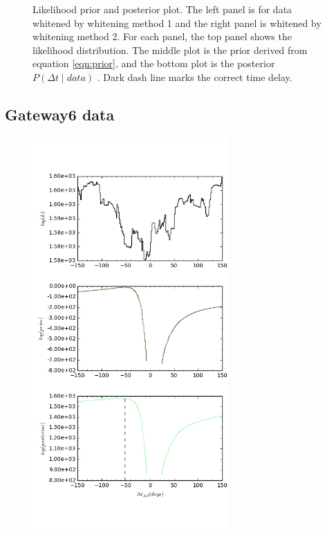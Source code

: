 \documentclass[\docopts]{\docclass}
\begin{document}
\begin{figure}[!h]
\begin{minipage}[bottom]{0.4\textwidth}
  \end{minipage}
 \caption{Likelihood prior and posterior plot. The left panel is for data whitened by whitening method 1 and the right panel is whitened by whitening method 2. For each panel, the top panel shows the likelihood distribution. The middle plot is the prior derived from equation \ref{eqn:prior}, and the bottom plot is the posterior $P(\Delta t \mid data)$ . Dark dash line marks the correct time delay. }
\end{figure}
\newpage

\subsection{Gateway6 data}

\begin{figure}[!h]
  \centering
  \begin{minipage}[bottom]{0.4\textwidth}
\includegraphics[width=\textwidth, height=15cm, keepaspectratio]{whiten1/data6_full_log.png}
  \end{minipage}
  \hfill
  \begin{minipage}[bottom]{0.4\textwidth}

\end{minipage}
\end{figure}
\end{document}
